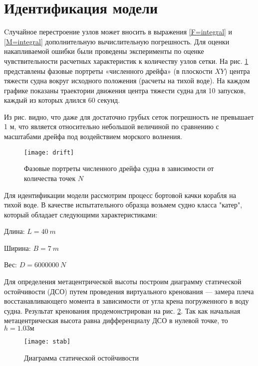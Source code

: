 \section{Идентификация модели}

Cлучайное перестроение узлов может вносить в выражения \eqref{F=integral} и \eqref{M=integral} дополнительную вычислительную погрешность. Для оценки накапливаемой ошибки были проведены эксперименты по оценке чувствительности расчетных характеристик к количеству узлов сетки. На рис. \ref{drift} представлены фазовые портреты «численного дрейфа» (в плоскости $XY$) центра тяжести судна вокруг исходного положения (расчеты на тихой воде). На каждом графике показаны траектории движения центра тяжести судна для 10 запусков, каждый из которых длился 60 секунд.

Из рис. видно, что даже для достаточно грубых сеток погрешность не превышает 1 м, что является относительно небольшой величиной по сравнению с масштабами дрейфа под воздействием морского волнения.

\begin{figure}[ht]
\begin{center}
\texttt{[image: drift]}
\end{center}
\caption{Фазовые портреты численного дрейфа судна в зависимости от количества точек $N$ }
\label{drift}
\end{figure}

Для идентификации модели рассмотрим процесс бортовой качки корабля на тихой воде.
В качестве испытательного образца возьмем судно класса "катер", который обладает следующими характеристиками:
\begin{description}
\item	Длина: $L = 40\ m$
\item	Ширина: $B = 7\ m$
\item	Вес: $D = 6 000 000\ N$
\end{description}

Для определения метацентрической высоты построим диаграмму статической остойчивости (ДСО) путем проведения виртуального кренования --- замера плеча восстанавливающего момента в зависимости от угла крена погруженного в воду судна. Результат кренования продемонстрирован на рис. \ref{stab}. Так как начальная метацентрическая высота равна дифференциалу ДСО в нулевой точке, то $h=1.03 м$

\begin{figure}[ht]
\begin{center}
\texttt{[image: stab]}
\end{center}
\caption{Диаграмма статической остойчивости}
\label{stab}
\end{figure}

